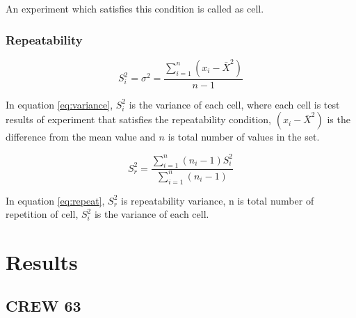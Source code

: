 \documentclass[11pt,a4paper,headinclude,footinclude,chapterprefix=on]{scrreprt}
\begin{document}
An experiment which satisfies this condition is called as cell. 

\subsection{Repeatability}

\begin{equation}\label{eq:variance}
{S}_i^2 = {\sigma}^2 =  \frac{\sum\limits_{i=1}^{n} (x_{i} - \bar{X}^2)}{n-1}
\end{equation}

In equation \ref{eq:variance},
 $S_{i}^{2}$ is the variance of each cell, where each cell is test results of experiment that satisfies the repeatability condition, $(x_{i} - \bar{X}^2)$ is the difference from the mean value and $n$ is total number of values in the set.

\begin{equation}\label{eq:repeat}
{S}_r^2 = \frac{\sum\limits_{i=1}^{n} (n_{i} - 1){S}_i^2}
{\sum\limits_{i=1}^{n}(n_{i} - 1)}
\end{equation}

In equation \ref{eq:repeat},
${S}_r^2$ is repeatability variance, n is total number of repetition of cell, $S_{i}^{2}$ is the variance of each cell. 


\chapter{Results}
\section{CREW 63}
\end{document}
